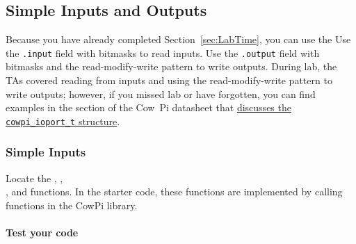 \subsection{Simple Inputs and Outputs} \label{subsec:simpleIO}

Because you have already completed Section~\ref{sec:LabTime}, you can use the
Use the \lstinline{.input} field with bitmasks to read inputs.
Use the \lstinline{.output} field with bitmasks and the read-modify-write pattern to write outputs.
During lab, the TAs covered reading from inputs and using the read-modify-write pattern to write outputs;
however, if you missed lab or have forgotten, you can find examples in the section of the Cow~Pi datasheet that \href{https://cow-pi.readthedocs.io/en/latest/CowPi_\lowercaseprocessor/io_registers.html#structure-for-memory-mapped-input-output}{discusses the \lstinline{cowpi_ioport_t} structure}.

\subsubsection{Simple Inputs}

Locate the , , \\ , and   functions.
In the starter code, these functions are implemented by calling functions in the CowPi library.

\begin{description}
\end{description}

\paragraph{Test your code}

